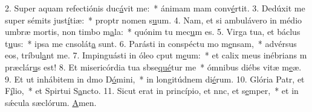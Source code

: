 2. Super aquam refectiónis duc\uline{á}vit me:~* ánimam mam conv\uline{é}rtit.
3. Dedúxit me super sémits just\uline{í}tiæ:~* proptr nomen s\uline{u}um.
4. Nam, et si ambulávero in médio umbræ mortis, non timbo m\uline{a}la:~* quónim tu mec\uline{u}m es.
5. Virga tua, et báclus t\uline{u}us:~* ipsa me cnsolát\uline{a} sunt.
6. Parásti in conspéctu mo m\uline{e}nsam,~* advérsus eos,  tríbul\uline{a}nt me.
7. Impinguásti in óleo cput m\uline{e}um:~* et calix meus inébrians m præclár\uline{u}s est!
8. Et misericórdia tua sbse\uline{qué}tur me~* ómnibus diébs vitæ m\uline{e}æ.
9. Et ut inhábitem in dmo D\uline{ó}mini,~* in longitúdnem di\uline{é}rum.
10. Glória Patr, et F\uline{í}lio,~* et Spirtui S\uline{a}ncto.
11. Sicut erat in princípio, et nnc, et s\uline{e}mper,~* et in sǽcula sæclórum. \uline{A}men.
